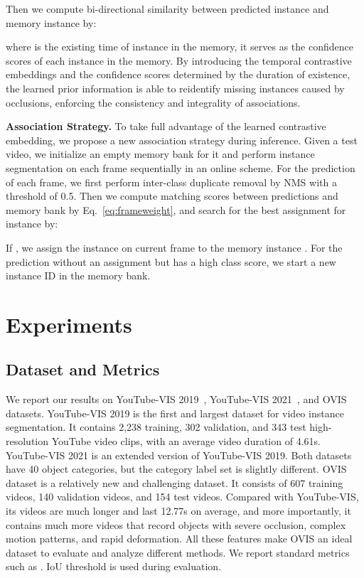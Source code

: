 \documentclass[runningheads]{llncs}
\begin{document}
Then we compute bi-directional similarity  between predicted instance  and memory instance  by:

where  is the existing time of instance  in the memory, it serves as the confidence scores of each instance in the memory.
By introducing the temporal contrastive embeddings and the confidence scores determined by the duration of existence, 
the learned prior information is able to reidentify missing instances caused by occlusions, enforcing the consistency and integrality of associations.


\noindent\textbf{Association Strategy.}
To take full advantage of the learned contrastive embedding, we propose a new association strategy during inference.
Given a test video, we initialize an empty memory bank for it and perform instance segmentation on each frame sequentially in an online scheme. For the prediction of each frame, we first perform inter-class duplicate removal by NMS with a threshold of 0.5.
Then we compute matching scores  between predictions and memory bank by Eq.~\ref{eq:frameweight}, and search for the best assignment for instance  by: 

If , we assign the instance  on current frame to the memory instance . For the prediction without an assignment but has a high class score, we start a new instance ID in the memory bank.  




\section{Experiments}

\subsection{Dataset and Metrics}
\label{sec:dataset}
We report our results on YouTube-VIS 2019~\cite{MaskTrackRCNN}, YouTube-VIS 2021~\cite{ytvis21dataset}, and OVIS~\cite{ovis} datasets. YouTube-VIS 2019 is the first and largest dataset for video instance segmentation. It contains 2,238 training, 302 validation, and 343 test high-resolution YouTube video clips, with an average video duration of 4.61s. 
YouTube-VIS 2021 is an extended version of YouTube-VIS 2019. 
Both datasets have 40  object categories, but the category label set is slightly different. 
OVIS dataset is a relatively new and challenging dataset. It consists of 607 training videos, 140 validation videos, and 154 test videos. Compared with YouTube-VIS, its videos are much longer and last 12.77s on average, and more importantly, it contains much more videos that record objects with severe occlusion, complex motion patterns, and rapid deformation. 
All these features make OVIS an ideal dataset to evaluate and analyze different methods.
We report standard metrics such as . IoU threshold is used during evaluation.
\end{document}
